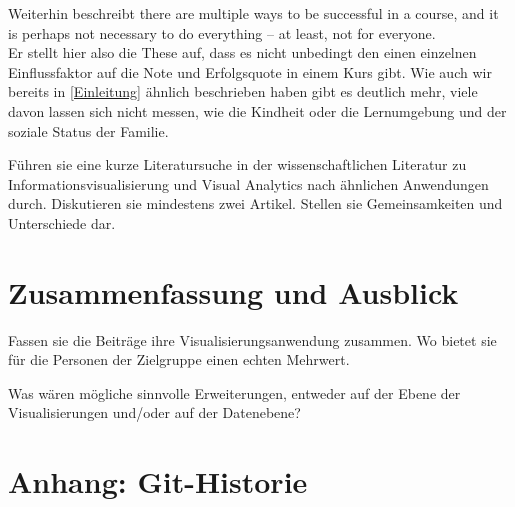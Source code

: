 \documentclass[usegeometry=true]{scrartcl}
\begin{document}
\noindent Weiterhin beschreibt \cite{Xu14, page 2}\: \glqq [...] there are multiple ways to be
successful in a course, and it is perhaps not necessary to do
everything – at least, not for everyone\grqq .\\
Er stellt hier also die These auf, dass es nicht unbedingt den einen einzelnen Einflussfaktor auf die Note und Erfolgsquote in einem Kurs gibt. Wie auch wir bereits in \ref{Einleitung} ähnlich beschrieben haben gibt es deutlich mehr, viele davon lassen sich nicht messen, wie die Kindheit oder die Lernumgebung und der soziale Status der Familie.
















Führen sie eine kurze Literatursuche in der wissenschaftlichen Literatur zu Informationsvisualisierung und Visual Analytics nach ähnlichen Anwendungen durch. Diskutieren sie mindestens zwei Artikel. Stellen sie Gemeinsamkeiten und Unterschiede dar.

\section{Zusammenfassung und Ausblick}
Fassen sie die Beiträge ihre Visualisierungsanwendung zusammen. Wo bietet sie für die Personen der Zielgruppe einen echten Mehrwert.

Was wären mögliche sinnvolle Erweiterungen, entweder auf der Ebene der Visualisierungen und/oder auf der Datenebene?

\section*{Anhang: Git-Historie}

\printbibliography
\end{document}
